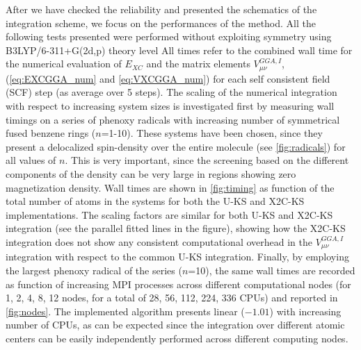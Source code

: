 After we have checked the reliability and presented the schematics of the integration scheme, 
we focus on the performances of the method.
All the following tests presented were performed without exploiting symmetry using B3LYP/6-311+G(2d,p) theory level
All times refer to the combined wall time for 
the numerical evaluation of $E_{XC}$ and the matrix elements  $V^{GGA,I}_{\mu\nu}$, (\cref{eq:EXCGGA_num} and \cref{eq:VXCGGA_num}) for
each  self consistent field (SCF) step (as average over 5 steps).
The scaling of the numerical integration
with respect to increasing system sizes is investigated first by measuring wall timings on a series of phenoxy radicals with increasing number of symmetrical fused benzene rings ($n$=1-10). 
These systems have been chosen, since they present a delocalized spin-density over the entire molecule (see \cref{fig:radicals}) for all values of $n$. This is very important, since the screening based on the different components of the density can be very large in regions showing zero magnetization density.
Wall times are shown in \cref{fig:timing} as function of the total number of atoms in the systems for both the U-KS and X2C-KS implementations.
The scaling factors are similar for both U-KS and X2C-KS integration (see the parallel fitted lines in the figure), showing how the  X2C-KS integration does not show any consistent computational overhead in the   $V^{GGA,I}_{\mu\nu}$ integration with
respect to the common U-KS integration. 
Finally, by employing the largest phenoxy radical of the series ($n$=10), the same wall times are recorded as function of increasing MPI processes across different computational nodes (for 1, 2, 4, 8, 12 nodes, for a total 
of 28, 56, 112, 224, 336 CPUs) and reported in \cref{fig:nodes}. 
The implemented algorithm presents linear ($-1.01$) with increasing number of CPUs, as can be expected since the integration over different atomic centers can be easily independently performed across different computing nodes.
